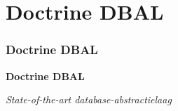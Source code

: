 %

\section{Doctrine DBAL}
\begin{frame}[fragile]
	\frametitle{Doctrine DBAL}

	\begin{center}\huge{\color{typo3darkgrey}\textbf{Doctrine DBAL}}\end{center}
	\begin{center}\large{\textit{State-of-the-art database-abstractielaag}}\end{center}

\end{frame}




